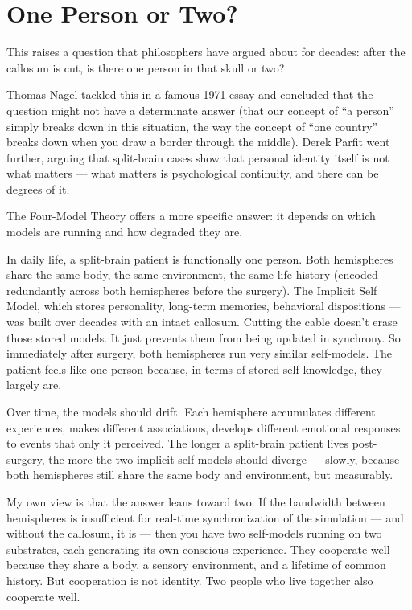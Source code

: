 \documentclass[11pt, twoside, openright]{book}
\begin{document}
\section*{One Person or Two?}

This raises a question that philosophers have argued about for decades: after the callosum is cut, is there one person in that skull or two?

Thomas Nagel tackled this in a famous 1971 essay and concluded that the question might not have a determinate answer (that our concept of ``a person'' simply breaks down in this situation, the way the concept of ``one country'' breaks down when you draw a border through the middle). Derek Parfit went further, arguing that split-brain cases show that personal identity itself is not what matters --- what matters is psychological continuity, and there can be degrees of it.

The Four-Model Theory offers a more specific answer: it depends on which models are running and how degraded they are.

In daily life, a split-brain patient is functionally one person. Both hemispheres share the same body, the same environment, the same life history (encoded redundantly across both hemispheres before the surgery). The Implicit Self Model, which stores personality, long-term memories, behavioral dispositions --- was built over decades with an intact callosum. Cutting the cable doesn't erase those stored models. It just prevents them from being updated in synchrony. So immediately after surgery, both hemispheres run very similar self-models. The patient feels like one person because, in terms of stored self-knowledge, they largely are.

Over time, the models should drift. Each hemisphere accumulates different experiences, makes different associations, develops different emotional responses to events that only it perceived. The longer a split-brain patient lives post-surgery, the more the two implicit self-models should diverge --- slowly, because both hemispheres still share the same body and environment, but measurably.

My own view is that the answer leans toward two. If the bandwidth between hemispheres is insufficient for real-time synchronization of the simulation --- and without the callosum, it is --- then you have two self-models running on two substrates, each generating its own conscious experience. They cooperate well because they share a body, a sensory environment, and a lifetime of common history. But cooperation is not identity. Two people who live together also cooperate well.
\end{document}
